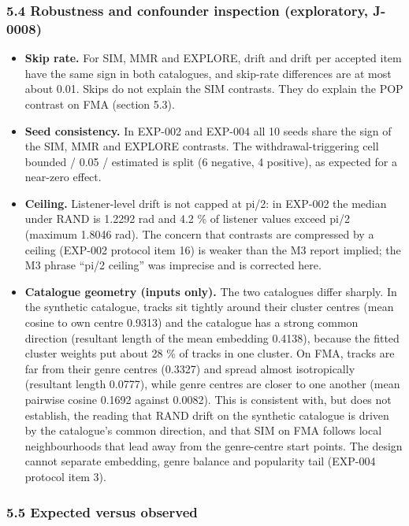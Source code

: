 \documentclass[
]{article}
\providecommand{\tightlist}{%
  \setlength{\itemsep}{0pt}\setlength{\parskip}{0pt}}
\begin{document}
\subsubsection{5.4 Robustness and confounder inspection (exploratory,
J-0008)}\label{robustness-and-confounder-inspection-exploratory-j-0008}

\begin{itemize}
\tightlist
\item
  \textbf{Skip rate.} For SIM, MMR and EXPLORE, drift and drift per
  accepted item have the same sign in both catalogues, and skip-rate
  differences are at most about 0.01. Skips do not explain the SIM
  contrasts. They do explain the POP contrast on FMA (section 5.3).
\item
  \textbf{Seed consistency.} In EXP-002 and EXP-004 all 10 seeds share
  the sign of the SIM, MMR and EXPLORE contrasts. The
  withdrawal-triggering cell bounded / 0.05 / estimated is split (6
  negative, 4 positive), as expected for a near-zero effect.
\item
  \textbf{Ceiling.} Listener-level drift is not capped at pi/2: in
  EXP-002 the median under RAND is 1.2292 rad and 4.2 \% of listener
  values exceed pi/2 (maximum 1.8046 rad). The concern that contrasts
  are compressed by a ceiling (EXP-002 protocol item 16) is weaker than
  the M3 report implied; the M3 phrase ``pi/2 ceiling'' was imprecise
  and is corrected here.
\item
  \textbf{Catalogue geometry (inputs only).} The two catalogues differ
  sharply. In the synthetic catalogue, tracks sit tightly around their
  cluster centres (mean cosine to own centre 0.9313) and the catalogue
  has a strong common direction (resultant length of the mean embedding
  0.4138), because the fitted cluster weights put about 28 \% of tracks
  in one cluster. On FMA, tracks are far from their genre centres
  (0.3327) and spread almost isotropically (resultant length 0.0777),
  while genre centres are closer to one another (mean pairwise cosine
  0.1692 against 0.0082). This is consistent with, but does not
  establish, the reading that RAND drift on the synthetic catalogue is
  driven by the catalogue's common direction, and that SIM on FMA
  follows local neighbourhoods that lead away from the genre-centre
  start points. The design cannot separate embedding, genre balance and
  popularity tail (EXP-004 protocol item 3).
\end{itemize}

\subsubsection{5.5 Expected versus
observed}\label{expected-versus-observed}
\end{document}
